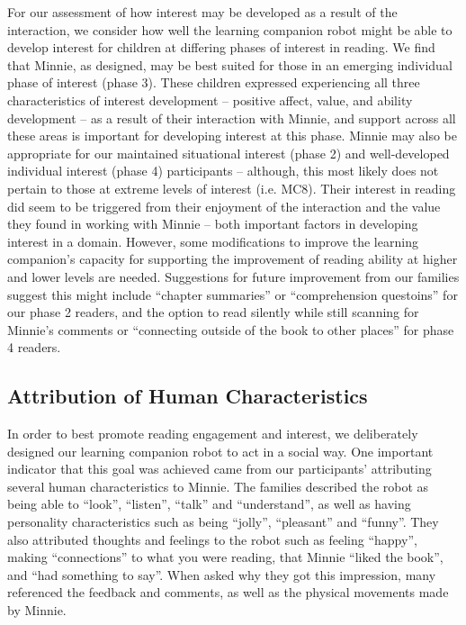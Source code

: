 \documentclass{sigchi}
\begin{document}
For our assessment of how interest may be developed as a result of the interaction, we consider how well the learning companion robot might be able to develop interest for children at differing phases of interest in reading. We find that Minnie, as designed, may be best suited for those in an emerging individual phase of interest (phase 3). These children expressed experiencing all three characteristics of interest development -- positive affect, value, and ability development -- as a result of their interaction with Minnie, and support across all these areas is important for developing interest at this phase. Minnie may also be appropriate for our maintained situational interest (phase 2) and well-developed individual interest (phase 4) participants --   although, this most likely does not pertain to those at extreme levels of interest (i.e. MC8). Their interest in reading did seem to be triggered from their enjoyment of the interaction and the value they found in working with Minnie -- both important factors in developing interest in a domain. However, some modifications to improve the learning companion's capacity for supporting the improvement of reading ability at higher and lower levels are needed. Suggestions for future improvement from our families suggest this might include ``chapter summaries'' or ``comprehension questoins'' for our phase 2 readers, and the option to read silently while still scanning for Minnie's comments or ``connecting outside of the book to other places'' for phase 4 readers. 

\subsection{Attribution of Human Characteristics}

In order to best promote reading engagement and interest, we deliberately designed our learning companion robot to act in a social way. One important indicator that this goal was achieved came from our participants' attributing several human characteristics to Minnie. The families described the robot as being able to ``look'', ``listen'', ``talk'' and ``understand'', as well as having personality characteristics such as being ``jolly'', ``pleasant'' and ``funny''. They also attributed thoughts and feelings to the robot such as feeling ``happy'', making ``connections'' to what you were reading, that Minnie ``liked the book'', and ``had something to say''. When asked why they got this impression, many referenced the feedback and comments, as well as the physical movements made by Minnie. 
\end{document}
